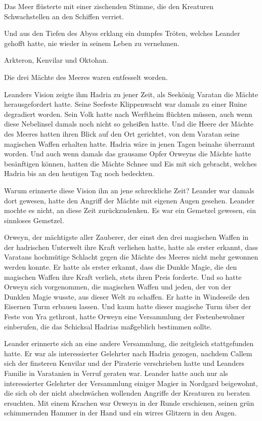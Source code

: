 Das Meer flüsterte mit einer zischenden Stimme, die den Kreaturen Schwachstellen an den Schiffen verriet.

Und aus den Tiefen des Abyss erklang ein dumpfes Tröten, welches Leander gehofft hatte, nie wieder in seinem Leben zu vernehmen.

Arkteron, Kenvilar und Oktohan.

Die drei Mächte des Meeres waren entfesselt worden.

Leanders Vision zeigte ihm Hadria zu jener Zeit, als Seekönig Varatan die Mächte herausgefordert hatte. Seine Seefeste Klippenwacht war damals zu einer Ruine degradiert worden. Sein Volk hatte nach Werftheim flüchten müssen, auch wenn diese Nebelinsel damals noch nicht so geheißen hatte. Und die Heere der Mächte des Meeres hatten ihren Blick auf den Ort gerichtet, von dem Varatan seine magischen Waffen erhalten hatte. Hadria wäre in jenen Tagen beinahe überrannt worden. Und auch wenn damals das grausame Opfer Orweyns die Mächte hatte besänftigen können, hatten die Mächte Schnee und Eis mit sich gebracht, welches Hadria bis an den heutigen Tag noch bedeckten.

Warum erinnerte diese Vision ihn an jene schreckliche Zeit? Leander war damals dort gewesen, hatte den Angriff der Mächte mit eigenen Augen gesehen. Leander mochte es nicht, an diese Zeit zurückzudenken. Es war ein Gemetzel gewesen, ein sinnloses Gemetzel.

Orweyn, der mächtigste aller Zauberer, der einst den drei magischen Waffen in der hadrischen Unterwelt ihre Kraft verliehen hatte, hatte als erster erkannt, dass Varatans hochmütige Schlacht gegen die Mächte des Meeres nicht mehr gewonnen werden konnte. Er hatte als erster erkannt, dass die Dunkle Magie, die den magischen Waffen ihre Kraft verlieh, stets ihren Preis forderte. Und so hatte Orweyn sich vorgenommen, die magischen Waffen und jeden, der von der Dunklen Magie wusste, aus dieser Welt zu schaffen. Er hatte in Windeseile den Eisernen Turm erbauen lassen. Und kaum hatte dieser magische Turm über der Feste von Yra gethront, hatte Orweyn eine Versammlung der Festenbewohner einberufen, die das Schicksal Hadrias maßgeblich bestimmen sollte.

Leander erinnerte sich an eine andere Versammlung, die zeitgleich stattgefunden hatte. Er war als interessierter Gelehrter nach Hadria gezogen, nachdem Callem sich der finsteren Kenvilar und der Piraterie verschrieben hatte und Leanders Familie in Varatanien in Verruf geraten war. Leander hatte auch nur als interessierter Gelehrter der Versammlung einiger Magier in Nordgard beigewohnt, die sich ob der nicht abschwächen wollenden Angriffe der Kreaturen zu beraten ersuchten. Mit einem Krachen war Orweyn in der Runde erschienen, seinen grün schimmernden Hammer in der Hand und ein wirres Glitzern in den Augen.

